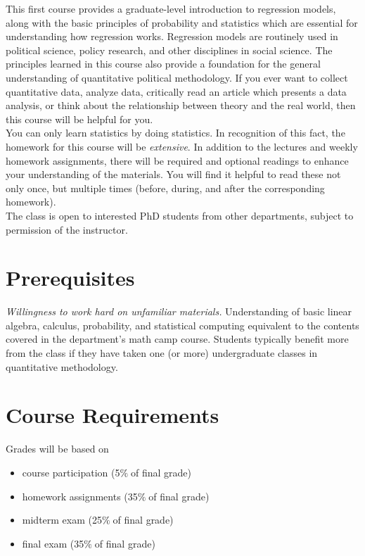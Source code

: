 \documentclass[PS]{syllabus}
\newcommand{\percent}{\ensuremath{\%\;}}
\begin{document}
\begin{syllabus}
This first course provides a graduate-level introduction to regression models, along with the basic principles of probability and statistics which are essential for understanding how regression works. Regression models are routinely used in political science, policy research, and other disciplines in social science. The principles learned in this course also provide a foundation for the general understanding of quantitative political methodology. If you ever want to collect quantitative data, analyze data, critically read an article which presents a data analysis, or think about the relationship between theory and the real world, then this course will be helpful for you.\\

You can only learn statistics by doing statistics. In recognition of this fact, the homework for this course will be {\it extensive}. In addition to the lectures and weekly homework assignments, there will be required and optional readings to enhance your understanding of the materials. You will find it helpful to read these not only once, but multiple times (before, during, and after the corresponding homework).\\

The class is open to interested PhD students from other departments, subject to permission of the instructor.

\section*{Prerequisites}

{\it Willingness to work hard on unfamiliar materials.}  Understanding of basic linear algebra, calculus, probability, and statistical computing equivalent to the contents covered in the department's math camp course. Students typically benefit more from the class if they have taken one (or more) undergraduate classes in quantitative methodology.

\clearpage

\section*{Course Requirements}

Grades will be based on
\begin{itemize}
\item course participation (5\percent of final grade)
\item homework assignments (35\percent of final grade)
\item midterm exam (25\percent of final grade)
\item final exam (35\percent of final grade)
\end{itemize}


\end{syllabus}
\end{document}
